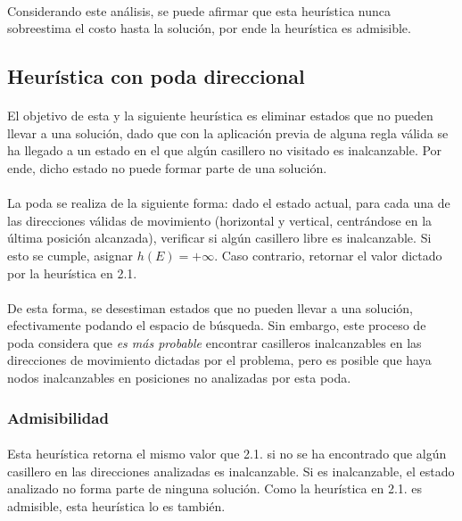 \documentclass[12pt, twocolumn]{article}
\begin{document}
    \paragraph{} Considerando este análisis, se puede afirmar que esta heurística nunca sobreestima el costo hasta la solución, por ende la heurística es admisible. 

	\subsection{Heurística con poda direccional}
	
	\paragraph{} El objetivo de esta y la siguiente heurística es eliminar estados que no pueden llevar a una solución, dado que con la aplicación previa de alguna regla válida se ha llegado a un estado en el que algún casillero no visitado es inalcanzable. Por ende, dicho estado no puede formar parte de una solución.
	
	\paragraph{} La poda se realiza de la siguiente forma: dado el estado actual, para cada una de las direcciones válidas de movimiento (horizontal y vertical, centrándose en la última posición alcanzada), verificar si algún casillero libre es inalcanzable. Si esto se cumple, asignar $h(E) = + \infty$. Caso contrario, retornar el valor dictado por la heurística en 2.1.
	
	\paragraph{} De esta forma, se desestiman estados que no pueden llevar a una solución, efectivamente podando el espacio de búsqueda. Sin embargo, este proceso de poda considera que \textit{es más probable} encontrar casilleros inalcanzables en las direcciones de movimiento dictadas por el problema, pero es posible que haya nodos inalcanzables en posiciones no analizadas por esta poda.
	
	\subsubsection{Admisibilidad}
	
	\paragraph{} Esta heurística retorna el mismo valor que 2.1. si no se ha encontrado que algún casillero en las direcciones analizadas es inalcanzable. Si es inalcanzable, el estado analizado no forma parte de ninguna solución. Como la heurística en 2.1. es admisible, esta heurística lo es también.  
	
\end{document}
